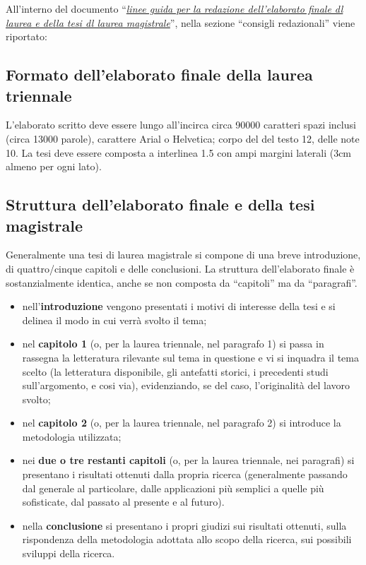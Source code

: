 All'interno del documento \enquote{\emph{\href{https://infostudenti.unitn.it/it/conseguimento-titolo-corsi-di-laurea-sociologia-e-ricerca-sociale}{linee guida per la redazione dell'elaborato finale dl laurea e della tesi dl laurea magistrale}}}, nella sezione \enquote{consigli redazionali} viene riportato:

\subsection{Formato dell'elaborato finale della laurea triennale}

L'elaborato scritto deve essere lungo all'incirca circa \num{90000} caratteri spazi inclusi (circa \num{13000} parole), carattere Arial o Helvetica; corpo del del testo 12, delle note 10.
La tesi deve essere composta a interlinea \num{1.5} con ampi margini laterali (3cm almeno per ogni lato).

\subsection{Struttura dell'elaborato finale e della tesi magistrale}

Generalmente una tesi di laurea magistrale si compone di una breve introduzione, di quattro/cinque capitoli e delle conclusioni.
La struttura dell'elaborato finale è sostanzialmente identica, anche se non composta da \enquote{capitoli} ma da \enquote{paragrafi}.
\begin{itemize}
    \item nell'\textbf{introduzione} vengono presentati i motivi di interesse della tesi e si delinea il modo in cui verrà svolto il tema;
    \item nel \textbf{capitolo 1} (o, per la laurea triennale, nel paragrafo 1) si passa in rassegna la letteratura rilevante sul tema in questione e vi si inquadra il tema scelto (la letteratura disponibile, gli antefatti storici, i precedenti studi sull'argomento, e cosi via), evidenziando, se del caso, l'originalità del lavoro svolto;
    \item nel \textbf{capitolo 2} (o, per la laurea triennale, nel paragrafo 2) si introduce la metodologia utilizzata;
    \item nei \textbf{due o tre restanti capitoli} (o, per la laurea triennale, nei paragrafi) si presentano i risultati ottenuti dalla propria ricerca (generalmente passando dal generale al particolare, dalle applicazioni più semplici a quelle più sofisticate, dal passato al presente e al futuro).
    \item nella \textbf{conclusione} si presentano i propri giudizi sui risultati ottenuti, sulla rispondenza della metodologia adottata allo scopo della ricerca, sui possibili sviluppi della ricerca.
\end{itemize}

